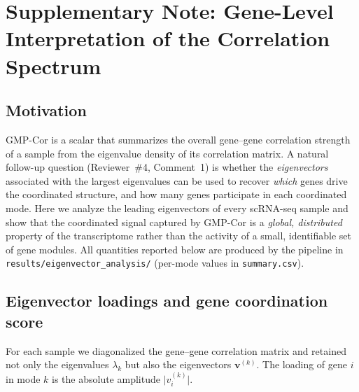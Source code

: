 
\section*{Supplementary Note: Gene-Level Interpretation of the Correlation Spectrum}

\subsection*{Motivation}

GMP-Cor is a scalar that summarizes the overall gene--gene correlation strength of a
sample from the eigenvalue density of its correlation matrix.
A natural follow-up question (Reviewer~\#4, Comment~1) is whether the \emph{eigenvectors}
associated with the largest eigenvalues can be used to recover \emph{which} genes drive
the coordinated structure, and how many genes participate in each coordinated mode.
Here we analyze the leading eigenvectors of every scRNA-seq sample and show that the
coordinated signal captured by GMP-Cor is a \emph{global, distributed} property of the
transcriptome rather than the activity of a small, identifiable set of gene modules.
All quantities reported below are produced by the pipeline in
\texttt{results/eigenvector\_analysis/} (per-mode values in \texttt{summary.csv}).

\subsection*{Eigenvector loadings and gene coordination score}

For each sample we diagonalized the gene--gene correlation matrix and retained not only
the eigenvalues $\lambda_k$ but also the eigenvectors $\mathbf{v}^{(k)}$.
The loading of gene $i$ in mode $k$ is the absolute amplitude
$\bigl|v_i^{(k)}\bigr|$.

